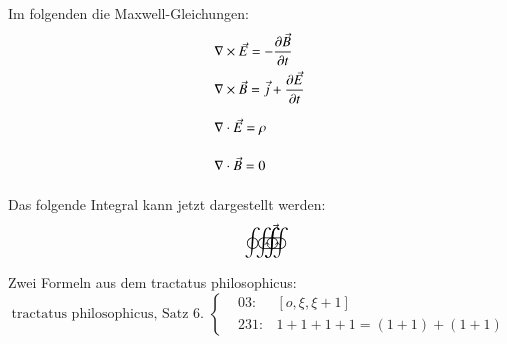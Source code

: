 \documentclass{scrartcl}
\begin{document}
Im folgenden die Maxwell-Gleichungen:
\begin{align}
&\nabla \times \vec{E} = - \frac{\partial \vec{B}}{\partial t}
\\
&\nabla \times \vec{B} = \vec{j} + \frac{\partial \vec{E}}{\partial t}
\\
&\nabla \cdot \vec{E} = \rho \vphantom{\frac{\partial \vec{E}}{\partial t}} %
\\
&\nabla \cdot \vec{B} = 0 \vphantom{\frac{\partial \vec{E}}{\partial t}}
\end{align}


Das folgende Integral kann jetzt dargestellt werden:
\begin{equation}
\oint \kern-0.45em \oiintctrclockwise \kern-1.3em \oiintclockwise  \kern-1.1em \vec{\vphantom{\oint}}
\end{equation}  


Zwei Formeln aus dem tractatus philosophicus:
\begin{equation}
\text{tractatus philosophicus, Satz 6. }
  \left\{
    \begin{matrix}
       
       & 03:  & [ o, \xi, \xi + 1] \\
       & 231: & 1 + 1 + 1 + 1 = (1+1) + (1+1) 
    \end{matrix}
  \right.
\end{equation}
	
\end{document}
